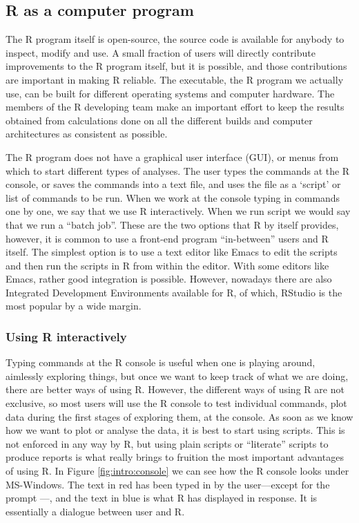 \documentclass[krantz2,ChapterTOCs]{krantz}\usepackage{knitr}
\begin{document}
\subsection{R as a computer program}

The R program itself is open-source, the source code is available for anybody to inspect, modify and use. A small fraction of users will directly contribute improvements to the R program itself, but it is possible, and those contributions are important in making R reliable. The executable, the R program we actually use, can be built for different operating systems and computer hardware. The members of the R developing team make an important effort to keep the results obtained from calculations done on all the different builds and computer architectures as consistent as possible.

The R program does not have a graphical user interface (GUI), or menus from which to start different types of analyses. The user types the commands at the R console, or saves the commands into a text file, and uses the file as a `script' or list of commands to be run. When we work at the console typing in commands one by one, we say that we use R interactively. When we run script we would say that we run a ``batch job''. These are the two options that R by itself provides, however, it is common to use a front-end program ``in-between'' users and R itself. The simplest option is to use a text editor like Emacs to edit the scripts and then run the scripts in R from within the editor. With some editors like Emacs, rather good integration is possible. However, nowadays there are also Integrated Development Environments available for R, of which, RStudio is
the most popular by a wide margin.

\subsubsection{Using R interactively}

Typing commands at the R console is useful when one is playing around, aimlessly exploring things, but once we want to keep track of what we are doing, there are better ways of using R. However, the different ways of using R are not exclusive, so most users will use the R console to test individual commands, plot data during the first stages of exploring them, at the console. As soon as we know how we want to plot or analyse the data, it is best to start using scripts. This is not enforced in any way by R, but using plain scripts or ``literate'' scripts to produce reports is what really brings to fruition the most important advantages of using R. In Figure \ref{fig:intro:console} we can see how the R console looks under MS-Windows. The text in red has been typed in by the user---except for the prompt \code{$>$}---, and the text in blue is what R has displayed in response. It is essentially a dialogue between user and R.
\end{document}
